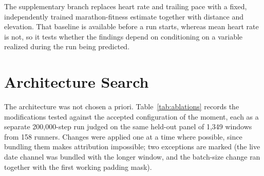 The supplementary branch replaces heart rate and trailing pace with a fixed, independently trained
marathon-fitness estimate together with distance and elevation. That baseline is available before a
run starts, whereas mean heart rate is not, so it tests whether the findings depend on conditioning
on a variable realized during the run being predicted.

\section{Architecture Search}
\label{app:ablation}

The architecture was not chosen a priori. Table~\ref{tab:ablations} records the modifications tested
against the accepted configuration of the moment, each as a separate 200{,}000-step run judged on the
same held-out panel of 1{,}349 windows from 158 runners. Changes were applied one at a time where possible, since
bundling them makes attribution impossible; two exceptions are marked (the live date channel was bundled with the longer window, and the batch-size change ran together with the first working padding mask).

